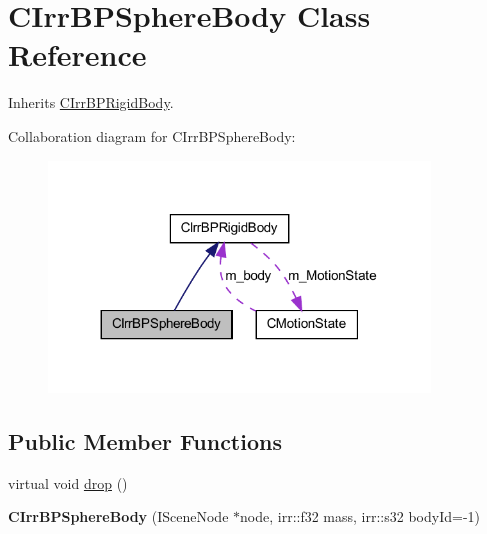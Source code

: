 \hypertarget{class_c_irr_b_p_sphere_body}{
\section{CIrrBPSphereBody Class Reference}
\label{class_c_irr_b_p_sphere_body}
}


Inherits \hyperlink{class_c_irr_b_p_rigid_body}{CIrrBPRigidBody}.



Collaboration diagram for CIrrBPSphereBody:\nopagebreak
\begin{figure}[H]
\begin{center}
\leavevmode
\includegraphics[width=287pt]{class_c_irr_b_p_sphere_body__coll__graph}
\end{center}
\end{figure}
\subsection*{Public Member Functions}
\begin{DoxyCompactItemize}
\item 
virtual void \hyperlink{class_c_irr_b_p_sphere_body_ae5060da603f81cb391c320ef35ae80eb}{drop} ()
\item 
\hypertarget{class_c_irr_b_p_sphere_body_afb99648bc34a2a8a1ae997078251d2d1}{
{\bfseries CIrrBPSphereBody} (ISceneNode $\ast$node, irr::f32 mass, irr::s32 bodyId=-\/1)}
\label{class_c_irr_b_p_sphere_body_afb99648bc34a2a8a1ae997078251d2d1}

\end{DoxyCompactItemize}


